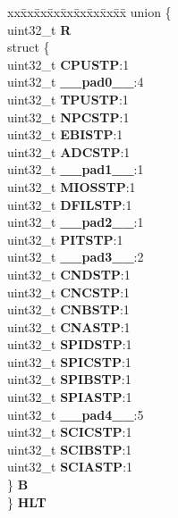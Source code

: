 \begin{DoxyCompactItemize}
\begin{tabbing}
\end{tabbing}\item 
\mbox{\label{structSIU__tag_abe6b65e596f1ec2690bfbf154981d202}} 
\begin{tabbing}
xx\=xx\=xx\=xx\=xx\=xx\=xx\=xx\=xx\=\kill
union \{\\
\>uint32\_t {\bfseries R}\\
\>struct \{\\
\>\>uint32\_t {\bfseries CPUSTP}:1\\
\>\>uint32\_t {\bfseries \_\_pad0\_\_}:4\\
\>\>uint32\_t {\bfseries TPUSTP}:1\\
\>\>uint32\_t {\bfseries NPCSTP}:1\\
\>\>uint32\_t {\bfseries EBISTP}:1\\
\>\>uint32\_t {\bfseries ADCSTP}:1\\
\>\>uint32\_t {\bfseries \_\_pad1\_\_}:1\\
\>\>uint32\_t {\bfseries MIOSSTP}:1\\
\>\>uint32\_t {\bfseries DFILSTP}:1\\
\>\>uint32\_t {\bfseries \_\_pad2\_\_}:1\\
\>\>uint32\_t {\bfseries PITSTP}:1\\
\>\>uint32\_t {\bfseries \_\_pad3\_\_}:2\\
\>\>uint32\_t {\bfseries CNDSTP}:1\\
\>\>uint32\_t {\bfseries CNCSTP}:1\\
\>\>uint32\_t {\bfseries CNBSTP}:1\\
\>\>uint32\_t {\bfseries CNASTP}:1\\
\>\>uint32\_t {\bfseries SPIDSTP}:1\\
\>\>uint32\_t {\bfseries SPICSTP}:1\\
\>\>uint32\_t {\bfseries SPIBSTP}:1\\
\>\>uint32\_t {\bfseries SPIASTP}:1\\
\>\>uint32\_t {\bfseries \_\_pad4\_\_}:5\\
\>\>uint32\_t {\bfseries SCICSTP}:1\\
\>\>uint32\_t {\bfseries SCIBSTP}:1\\
\>\>uint32\_t {\bfseries SCIASTP}:1\\
\>\} {\bfseries B}\\
\} {\bfseries HLT}\\


\end{tabbing}
\end{DoxyCompactItemize}
